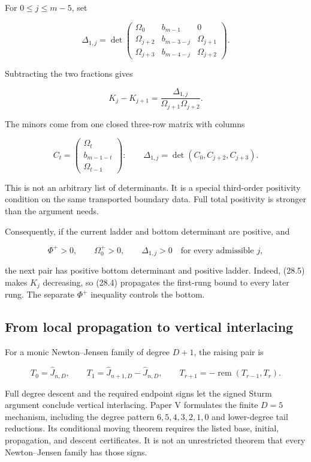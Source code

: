 \documentclass[
  10pt,
  a4paper,
  10pt,
  oneside,
  openany]{book}
\begin{document}
For \(0\le j\le m-5\), set

\[
 \Delta_{1,j}=
 \det\begin{pmatrix}
 \Omega_0&b_{m-1}&0\\
 \Omega_{j+2}&b_{m-3-j}&\Omega_{j+1}\\
 \Omega_{j+3}&b_{m-4-j}&\Omega_{j+2}
 \end{pmatrix}.
\]

Subtracting the two fractions gives

\[
 \boxed{K_j-K_{j+1}
 =\frac{\Delta_{1,j}}{\Omega_{j+1}\Omega_{j+2}}.}
 \tag{28.5}\label{eq:28.5}
\]

The minors come from one closed three-row matrix with columns

\[
 C_t=\begin{pmatrix}\Omega_t\\b_{m-1-t}\\\Omega_{t-1}\end{pmatrix}:
 \qquad\Delta_{1,j}=\det(C_0,C_{j+2},C_{j+3}).
\]

This is not an arbitrary list of determinants. It is a special
third-order positivity condition on the same transported boundary data.
Full total positivity is stronger than the argument needs.

Consequently, if the current ladder and bottom determinant are positive,
and

\[
 \Phi^+>0,\qquad\Omega_0^+>0,\qquad
 \Delta_{1,j}>0\quad\text{for every admissible }j,
 \tag{28.6}\label{eq:28.6}
\]

the next pair has positive bottom determinant and positive ladder.
Indeed, (28.5) makes \(K_j\) decreasing, so (28.4) propagates the
first-rung bound to every later rung. The separate \(\Phi^+\) inequality
controls the bottom.

\subsection{From local propagation to vertical
interlacing}\label{from-local-propagation-to-vertical-interlacing}

For a monic Newton--Jensen family of degree \(D+1\), the raising pair is

\[
 T_0=\widehat J_{n,D},\qquad
 T_1=\widehat J_{n+1,D}-\widehat J_{n,D},\qquad
 T_{r+1}=-\operatorname{rem}(T_{r-1},T_r).
 \tag{28.7}\label{eq:28.7}
\]

Full degree descent and the required endpoint signs let the signed Sturm
argument conclude vertical interlacing. Paper V formulates the finite
\(D=5\) mechanism, including the degree pattern \(6,5,4,3,2,1,0\) and
lower-degree tail reductions. Its conditional moving theorem requires
the listed base, initial, propagation, and descent certificates. It is
not an unrestricted theorem that every Newton--Jensen family has those
signs.
\end{document}
